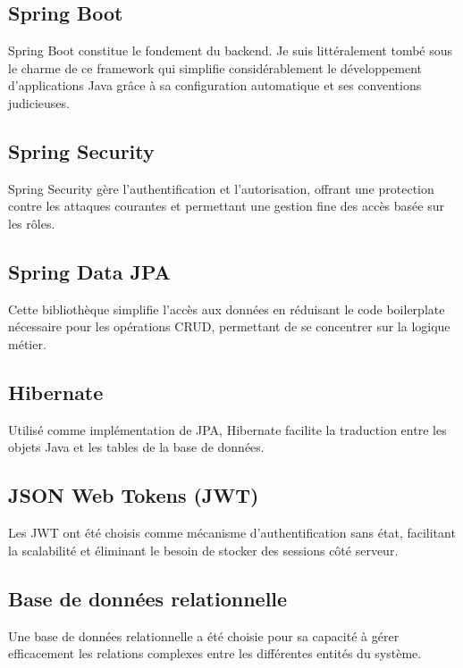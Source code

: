 \subsection{Spring Boot}

Spring Boot constitue le fondement du backend. Je suis littéralement tombé sous le charme de ce framework qui simplifie considérablement le développement d'applications Java grâce à sa configuration automatique et ses conventions judicieuses.

\subsection{Spring Security}

Spring Security gère l'authentification et l'autorisation, offrant une protection contre les attaques courantes et permettant une gestion fine des accès basée sur les rôles.

\subsection{Spring Data JPA}

Cette bibliothèque simplifie l'accès aux données en réduisant le code boilerplate nécessaire pour les opérations CRUD, permettant de se concentrer sur la logique métier.

\subsection{Hibernate}

Utilisé comme implémentation de JPA, Hibernate facilite la traduction entre les objets Java et les tables de la base de données.

\subsection{JSON Web Tokens (JWT)}

Les JWT ont été choisis comme mécanisme d'authentification sans état, facilitant la scalabilité et éliminant le besoin de stocker des sessions côté serveur.

\subsection{Base de données relationnelle}

Une base de données relationnelle a été choisie pour sa capacité à gérer efficacement les relations complexes entre les différentes entités du système.

